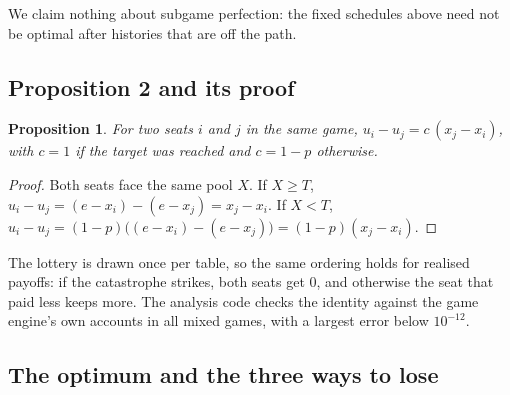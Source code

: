 \documentclass[10pt]{article}
\let\plainsubsection\subsection
\renewcommand{\subsection}{\FloatBarrier\needspace{8\baselineskip}\plainsubsection}
\newtheorem{proposition}{Proposition}
\begin{document}
We claim nothing about subgame perfection: the fixed schedules above need not be optimal after histories that are off the path.

\subsection{Proposition 2 and its proof}

\begin{proposition}
For two seats $i$ and $j$ in the same game, $u_i-u_j=c\,(x_j-x_i)$, with $c=1$ if the target was reached and $c=1-p$ otherwise.
\end{proposition}

\begin{proof}
Both seats face the same pool $X$. If $X\ge T$, $u_i-u_j=(e-x_i)-(e-x_j)=x_j-x_i$. If $X<T$, $u_i-u_j=(1-p)\big((e-x_i)-(e-x_j)\big)=(1-p)(x_j-x_i)$.
\end{proof}

The lottery is drawn once per table, so the same ordering holds for realised payoffs: if the catastrophe strikes, both seats get 0, and otherwise the seat that paid less keeps more. The analysis code checks the identity against the game engine's own accounts in all \MixGames{} mixed games, with a largest error below $10^{-12}$.

\subsection{The optimum and the three ways to lose}
\label{sec:loss}
\end{document}
